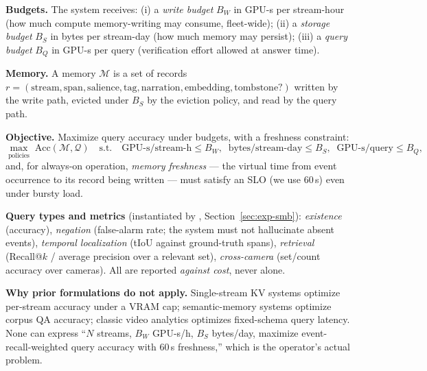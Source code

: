 \textbf{Budgets.} The system receives: (i) a \emph{write budget} $B_W$ in GPU-s per stream-hour (how much compute memory-writing may consume, fleet-wide); (ii) a \emph{storage budget} $B_S$ in bytes per stream-day (how much memory may persist); (iii) a \emph{query budget} $B_Q$ in GPU-s per query (verification effort allowed at answer time).

\textbf{Memory.} A memory $\mathcal{M}$ is a set of records $r = (\text{stream}, \text{span}, \text{salience}, \text{tag}, \text{narration}, \text{embedding}, \text{tombstone?})$ written by the write path, evicted under $B_S$ by the eviction policy, and read by the query path.

\textbf{Objective.} Maximize query accuracy under budgets, with a freshness constraint:
\begin{equation}
\max_{\text{policies}} \; \mathrm{Acc}(\mathcal{M}, \mathcal{Q}) \quad \text{s.t.} \quad \mathrm{GPU\text{-}s/stream\text{-}h} \le B_W,\;\; \mathrm{bytes/stream\text{-}day} \le B_S,\;\; \mathrm{GPU\text{-}s/query} \le B_Q,
\end{equation}
and, for always-on operation, \emph{memory freshness} --- the virtual time from event occurrence to its record being written --- must satisfy an SLO (we use 60\,s) even under bursty load.

\textbf{Query types and metrics} (instantiated by \smb, Section~\ref{sec:exp-smb}): \emph{existence} (accuracy), \emph{negation} (false-alarm rate; the system must not hallucinate absent events), \emph{temporal localization} (tIoU against ground-truth spans), \emph{retrieval} (Recall@$k$ / average precision over a relevant set), \emph{cross-camera} (set/count accuracy over cameras). All are reported \emph{against cost}, never alone.

\textbf{Why prior formulations do not apply.} Single-stream KV systems optimize per-stream accuracy under a VRAM cap; semantic-memory systems optimize corpus QA accuracy; classic video analytics optimizes fixed-schema query latency. None can express ``$N$ streams, $B_W$ GPU-s/h, $B_S$ bytes/day, maximize event-recall-weighted query accuracy with 60\,s freshness,'' which is the operator's actual problem.
